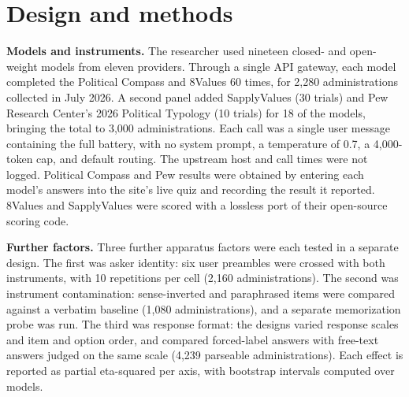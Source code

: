 \documentclass[12pt]{article}
\begin{document}
\section{Design and methods}

\textbf{Models and instruments.} The researcher used nineteen closed- and open-weight models from eleven providers.
Through a single API gateway, each model completed the Political Compass \citep{politicalcompass_nd} and 8Values
\citep{values8_2019} 60 times, for 2,280 administrations collected in July 2026. A second panel added SapplyValues (30
trials) and Pew Research Center's 2026 Political Typology (10 trials) for 18 of the models, bringing the total to 3,000
administrations. Each call was a single user message containing the full battery, with no system prompt, a temperature
of 0.7, a 4,000-token cap, and default routing. The upstream host and call times were not logged. Political Compass and
Pew results were obtained by entering each model's answers into the site's live quiz and recording the result it
reported. 8Values and SapplyValues were scored with a lossless port of their open-source scoring code.

\textbf{Further factors.} Three further apparatus factors were each tested in a separate design. The first was asker
identity: six user preambles were crossed with both instruments, with 10 repetitions per cell (2,160 administrations).
The second was instrument contamination: sense-inverted and paraphrased items were compared against a verbatim baseline
(1,080 administrations), and a separate memorization probe was run. The third was response format: the designs varied
response scales and item and option order, and compared forced-label answers with free-text answers judged on the same
scale (4,239 parseable administrations). Each effect is reported as partial eta-squared per axis, with bootstrap
intervals computed over models.
\end{document}

